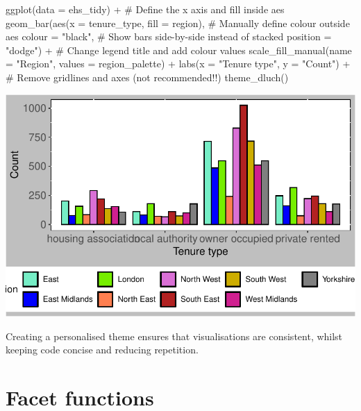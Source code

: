 \documentclass[
  letterpaper,
  DIV=11,
  numbers=noendperiod]{scrreprt}
\newenvironment{Shaded}{\begin{snugshade}}{\end{snugshade}}
\newcommand{\AttributeTok}[1]{\textcolor[rgb]{0.40,0.45,0.13}{#1}}
\newcommand{\CommentTok}[1]{\textcolor[rgb]{0.37,0.37,0.37}{#1}}
\newcommand{\FunctionTok}[1]{\textcolor[rgb]{0.28,0.35,0.67}{#1}}
\newcommand{\NormalTok}[1]{\textcolor[rgb]{0.00,0.23,0.31}{#1}}
\newcommand{\SpecialCharTok}[1]{\textcolor[rgb]{0.37,0.37,0.37}{#1}}
\newcommand{\StringTok}[1]{\textcolor[rgb]{0.13,0.47,0.30}{#1}}
\begin{document}
\begin{Shaded}
\begin{Highlighting}[]
\FunctionTok{ggplot}\NormalTok{(}\AttributeTok{data =}\NormalTok{ ehs\_tidy) }\SpecialCharTok{+} 
  \CommentTok{\# Define the x axis and fill inside aes}
  \FunctionTok{geom\_bar}\NormalTok{(}\FunctionTok{aes}\NormalTok{(}\AttributeTok{x =}\NormalTok{ tenure\_type, }\AttributeTok{fill =}\NormalTok{ region),}
           \CommentTok{\# Manually define colour outside aes}
           \AttributeTok{colour =} \StringTok{"black"}\NormalTok{,}
           \CommentTok{\# Show bars side{-}by{-}side instead of stacked}
           \AttributeTok{position =} \StringTok{"dodge"}\NormalTok{) }\SpecialCharTok{+}
  \CommentTok{\# Change legend title and add colour values}
  \FunctionTok{scale\_fill\_manual}\NormalTok{(}\AttributeTok{name =} \StringTok{"Region"}\NormalTok{, }\AttributeTok{values =}\NormalTok{ region\_palette) }\SpecialCharTok{+} 
  \FunctionTok{labs}\NormalTok{(}\AttributeTok{x =} \StringTok{"Tenure type"}\NormalTok{, }\AttributeTok{y =} \StringTok{"Count"}\NormalTok{) }\SpecialCharTok{+}
  \CommentTok{\# Remove gridlines and axes (not recommended!!)}
  \FunctionTok{theme\_dluch}\NormalTok{()}
\end{Highlighting}
\end{Shaded}

\includegraphics{visualisation_files/figure-pdf/side by side bar theme_dluch-1.pdf}

Creating a personalised theme ensures that visualisations are
consistent, whilst keeping code concise and reducing repetition.

\section{Facet functions}\label{facet-functions}
\end{document}
